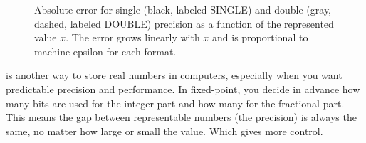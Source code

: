 \begin{figure}[h]
    \centering
    \caption{Absolute error for single (black, labeled SINGLE) and double (gray, dashed, labeled DOUBLE) precision as a function of the represented value $x$. The error grows linearly with $x$ and is proportional to machine epsilon for each format.}
    \label{fig:abs_error_float_double}
\end{figure}






 is another way to store real numbers in computers, 
especially when you want predictable precision and performance. In fixed-point, you decide in advance how 
many bits are used for the integer part and how many for the fractional part. This means the gap between 
representable numbers (the precision) is always the same, no matter how large or small the value. Which gives more control.

